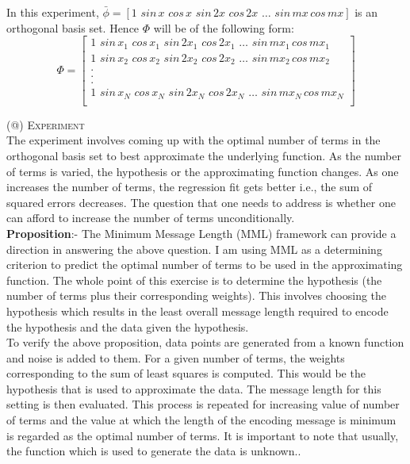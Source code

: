 \documentclass[a4paper,12pt]{article}
\makeatletter
\newcommand*{\rom}[1]{\expandafter\@slowromancap\romannumeral #1@}
\makeatother
\begin{document}
In this experiment, $\bar{\phi} = [1\,\,sin\,x\,\,cos\,x \,\,sin\,2x\,\,cos\,2x\,\,\ldots\,\,sin\,mx\,cos\,mx]$ is an orthogonal basis set. Hence $\Phi$ will be of the following form:
\begin{equation}\label{eqn:Phi}
 \Phi = \left[
		\begin{array}{c}
		    1\,\,sin\,x_1\,\,cos\,x_1\,\, sin\,2x_1\,\,cos\,2x_1\,\,\ldots\,\,sin\,mx_1\,cos\,mx_1 \\
		    1\,\,sin\,x_2\,\,cos\,x_2\,\, sin\,2x_2\,\,cos\,2x_2\,\,\ldots\,\,sin\,mx_2\,cos\,mx_2 \\
		    . \\ . \\. \\
		    1\,\,sin\,x_N\,\,cos\,x_N\,\, sin\,2x_N\,\,cos\,2x_N\,\,\ldots\,\,sin\,mx_N\,cos\,mx_N \\
		\end{array}
	\right]
\end{equation} 

\noindent (\rom{3}) \textsc{Experiment} \\
\hspace*{5mm} The experiment involves coming up with the optimal number of terms in the orthogonal basis set to best approximate the underlying function. As the number of terms is varied, the hypothesis or the approximating function changes. As one increases the number of terms, the regression fit gets better i.e., the sum of squared errors decreases. The question that one needs to address is whether one can afford to increase the number of terms unconditionally. \\

\noindent \textbf{Proposition}:- The Minimum Message Length (MML) framework can provide a direction in answering the above question. I am using MML as a determining criterion to predict the optimal number of terms to be used in the approximating function. The whole point of this exercise is to determine the hypothesis (the number of terms plus their corresponding weights). This involves choosing the hypothesis which results in the least overall message length required to encode the hypothesis and the data given the hypothesis. \\

\noindent To verify the above proposition, data points are generated from a known function and noise is added to them. For a given number of terms, the weights corresponding to the sum of least squares is computed. This would be the hypothesis that is used to approximate the data. The message length for this setting is then evaluated. This process is repeated for increasing value of number of terms and the value at which the length of the encoding message is minimum is regarded as the optimal number of terms. It is important to note that usually, the function which is used to generate the data is unknown.. \\ 
\end{document}
